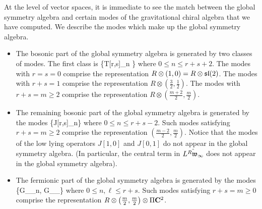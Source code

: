 \documentclass[../main.tex]{subfiles}
\begin{document}
At the level of vector spaces, it is immediate to see the match between the global symmetry algebra and certain modes of the gravitational chiral algebra that we have computed.
We describe the modes which make up the global symmetry algebra.
\begin{itemize}
\item The bosonic part of the global symmetry algebra is generated by two classes of modes.
The first class is
\beqn
\{T[r,s]_n \}
\eeqn
where $0 \leq n \leq r + s + 2$.
The modes with $r = s = 0$ comprise the representation $R \otimes (1,0) = R \otimes \mathfrak{sl}(2)$.
The modes with $r + s = 1$ comprise the representation $R \otimes \left(\frac32,\frac12\right)$.
The modes with $r + s = m \geq 2$ comprise the representation $R \otimes \left(\frac{m+2}{2}, \frac{m}{2}\right)$.
\item 
The remaining bosonic part of the global symmetry algebra is generated by the modes
\beqn
\{J[r,s]_n\}
\eeqn
where $0 \leq n \leq r + s - 2$.
Such modes satisfying $r + s = m \geq 2$ comprise the representation $\left(\frac{m-2}{2},\frac{m}2\right)$.
Notice that the modes of the low lying operators $J[1,0]$ and $J[0,1]$ do not appear in the global symmetry algebra. (In particular, the central term in $\Hat{L^R \mathfrak{w}_\infty}$ does not appear in the global symmetry algebra).
\item The fermionic part of the global symmetry algebra is generated by the modes
\beqn
\{G_\alpha[r,s]_n, G_\gamma[r,s]_\ell\}
\eeqn
where $0 \leq n,\ell \leq r + s$.
Such modes satisfying $r + s = m \geq 0$ comprise the representation $R \otimes \left(\frac{m}{2}, \frac{m}{2} \right) \otimes \Pi \mathbf{C}^2$.
\end{itemize}
\end{document}
